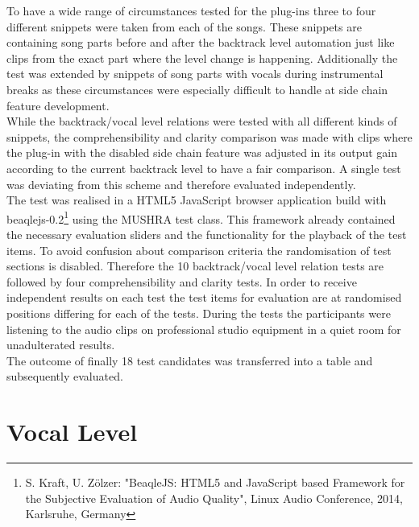 To have a wide range of circumstances tested for the plug-ins three to four different snippets were taken from each of the songs. These snippets are containing song parts before and after the backtrack level automation just like clips from the exact part where the level change is happening. Additionally the test was extended by snippets of song parts with vocals during instrumental breaks as these circumstances were especially difficult to handle at side chain feature development.\\
While the backtrack/vocal level relations were tested with all different kinds of snippets, the comprehensibility and clarity comparison was made with clips where the plug-in with the disabled side chain feature was adjusted in its output gain according to the current backtrack level to have a fair comparison. A single test was deviating from this scheme and therefore evaluated independently.\\
The test was realised in a HTML5 JavaScript browser application build with beaqlejs-0.2\footnote{S. Kraft, U. Zölzer: "BeaqleJS: HTML5 and JavaScript based Framework for the Subjective Evaluation of Audio Quality", Linux Audio Conference, 2014, Karlsruhe, Germany} using the MUSHRA test class. This framework already contained the necessary evaluation sliders and the functionality for the playback of the test items. To avoid confusion about comparison criteria the randomisation of test sections is disabled. Therefore the 10 backtrack/vocal level relation tests are followed by four comprehensibility and clarity tests. In order to receive independent results on each test the test items for evaluation are at randomised positions differing for each of the tests. During the tests the participants were listening to the audio clips on professional studio equipment in a quiet room for unadulterated results.\\
The outcome of finally 18 test candidates was transferred into a table and subsequently evaluated.\\

\section{Vocal Level}

